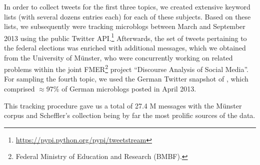 In order to collect tweets for the first three topics, we created
extensive keyword lists (with several dozens entries each) for each of
these subjects.  Based on these lists, we subsequently were tracking
microblogs between March and September 2013 using the public Twitter
API.\footnote{\url{https://pypi.python.org/pypi/tweetstream}}
Afterwards, the set of tweets pertaining to the federal elections was
enriched with additional messages, which we obtained from the
University of M\"unster, who were concurrently working on related
problems within the joint FMER\footnote{Federal Ministry of Education
  and Research (BMBF).} project ``Discourse Analysis of Social
Media''.  For sampling the fourth topic, we used the German Twitter
snapshot of \citet{Scheffler:14}, which comprised $\approx97\%$ of
German microblogs posted in April 2013.

This tracking procedure gave us a total of 27.4 M messages with the
M\"unster corpus and Scheffler's collection being by far the most
prolific sources of the data.






